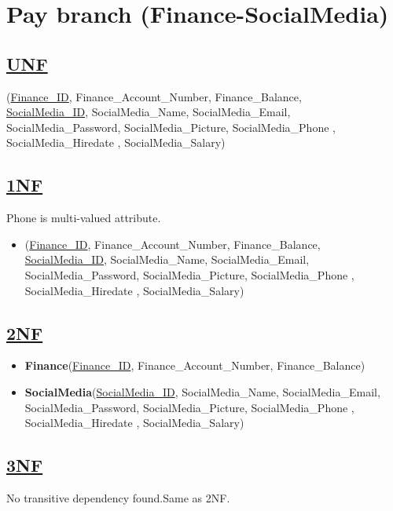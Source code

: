 \section{\texorpdfstring{\centering Pay branch (Finance-SocialMedia)}{Pay branch (Finance-SocialMedia)}}

\subsection*{\underline{UNF}}

(\underline{Finance\_ID}, Finance\_Account\_Number, Finance\_Balance,\\
\underline{SocialMedia\_ID}, SocialMedia\_Name, SocialMedia\_Email, SocialMedia\_Password, SocialMedia\_Picture, SocialMedia\_Phone ,  SocialMedia\_Hiredate , SocialMedia\_Salary)

\subsection*{\underline{1NF}}
Phone is multi-valued attribute.
\vskip 0.2in

\begin{itemize}
    \item
          (\underline{Finance\_ID}, Finance\_Account\_Number, Finance\_Balance,\\
          \underline{SocialMedia\_ID}, SocialMedia\_Name, SocialMedia\_Email, SocialMedia\_Password, SocialMedia\_Picture, SocialMedia\_Phone ,  SocialMedia\_Hiredate , SocialMedia\_Salary)
\end{itemize}

\subsection*{\underline{2NF}}
\begin{itemize}
    \item \textbf{Finance}(\underline{Finance\_ID}, Finance\_Account\_Number, Finance\_Balance)
    \item \textbf{SocialMedia}(\underline{SocialMedia\_ID}, SocialMedia\_Name, SocialMedia\_Email, SocialMedia\_Password, SocialMedia\_Picture, SocialMedia\_Phone ,  SocialMedia\_Hiredate , SocialMedia\_Salary)
\end{itemize}

\subsection*{\underline{3NF}}
No transitive dependency found.Same as 2NF.

